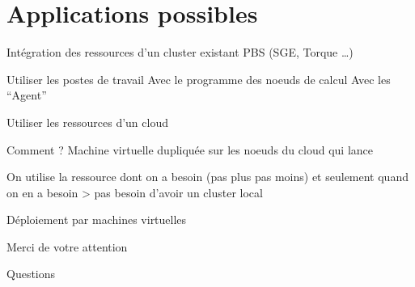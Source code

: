 \documentclass{beamer}
\begin{document}
\section[Applications]{Applications possibles}
\begin{frame}
	\tableofcontents[currentsection]
\end{frame}
\begin{frame}{Intégration des ressources d'un cluster existant}
    PBS (SGE, Torque \ldots)
\end{frame}
\begin{frame}{Utiliser les postes de travail}
    Avec le programme des noeuds de calcul
    Avec les ``Agent''
\end{frame}
\begin{frame}{Utiliser les ressources d'un cloud}
    \begin{exampleblock}{Comment ?}
        Machine virtuelle dupliquée sur les noeuds du cloud qui lance 
    \end{exampleblock}
    
     On utilise la ressource dont on a besoin (pas plus pas moins) et seulement quand on en a besoin
     > pas besoin d'avoir un cluster local

     Déploiement par machines virtuelles
\end{frame}


\begin{frame}
	\begin{center}	{\huge Merci de votre attention}\end{center}
	\end{frame}
\begin{frame}
	\begin{center}	{\huge Questions}\end{center}
	\end{frame}
\end{document}

